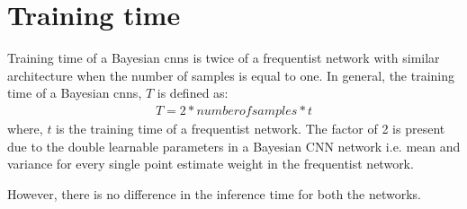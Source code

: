 \section{Training time}

Training time of a Bayesian \acp{cnn} is twice of a frequentist network with similar architecture when the number of samples is equal to one. In general, the training time of a Bayesian \acp{cnn}, $T$ is defined as:
\begin{align}
T = 2 * number of samples * t
\end{align}
where, $t$ is the training time of a frequentist network. 
The factor of 2 is present due to the double learnable parameters in a Bayesian CNN network i.e. mean and variance for every single point estimate weight in the frequentist network.

However, there is no difference in the inference time for both the networks. 


\ifpdf
    \graphicspath{{Chapter2/Figs/Raster/}{Chapter2/Figs/PDF/}{Chapter2/Figs/}}
\else
    \graphicspath{{Chapter2/Figs/Vector/}{Chapter2/Figs/}}
\fi


